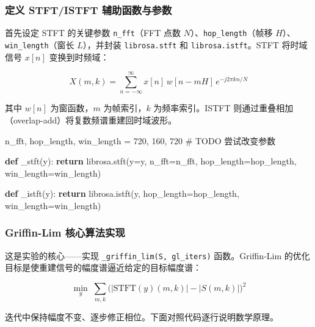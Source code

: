 \documentclass[
  english,
  letterpaper,
  DIV=11,
  numbers=noendperiod]{scrartcl}
\newenvironment{Shaded}{\begin{snugshade}}{\end{snugshade}}
\newcommand{\AlertTok}[1]{\textcolor[rgb]{0.68,0.00,0.00}{#1}}
\newcommand{\CommentTok}[1]{\textcolor[rgb]{0.37,0.37,0.37}{#1}}
\newcommand{\ControlFlowTok}[1]{\textcolor[rgb]{0.00,0.23,0.31}{\textbf{#1}}}
\newcommand{\DecValTok}[1]{\textcolor[rgb]{0.68,0.00,0.00}{#1}}
\newcommand{\KeywordTok}[1]{\textcolor[rgb]{0.00,0.23,0.31}{\textbf{#1}}}
\newcommand{\NormalTok}[1]{\textcolor[rgb]{0.00,0.23,0.31}{#1}}
\newcommand{\OperatorTok}[1]{\textcolor[rgb]{0.37,0.37,0.37}{#1}}
\begin{document}
\subsubsection{定义 STFT/ISTFT
辅助函数与参数}\label{ux5b9aux4e49-stftistft-ux8f85ux52a9ux51fdux6570ux4e0eux53c2ux6570}

首先设定 STFT 的关键参数 \texttt{n\_fft}（FFT 点数
\(N\)）、\texttt{hop\_length}（帧移 \(H\)）、\texttt{win\_length}（窗长
\(L\)），并封装 \texttt{librosa.stft} 和 \texttt{librosa.istft}。STFT
将时域信号 \(x[n]\) 变换到时频域：

\[X(m,k) = \sum_{n=-\infty}^{\infty} x[n]\, w[n - mH]\, e^{-j 2\pi kn/N}\]

其中 \(w[n]\) 为窗函数，\(m\) 为帧索引，\(k\) 为频率索引。ISTFT
则通过重叠相加（overlap-add）将复数频谱重建回时域波形。

\begin{Shaded}
\begin{Highlighting}[]
\NormalTok{n\_fft, hop\_length, win\_length }\OperatorTok{=} \DecValTok{720}\NormalTok{, }\DecValTok{160}\NormalTok{, }\DecValTok{720}  \CommentTok{\# }\AlertTok{TODO}\CommentTok{ 尝试改变参数}

\KeywordTok{def}\NormalTok{ \_stft(y):}
    \ControlFlowTok{return}\NormalTok{ librosa.stft(y}\OperatorTok{=}\NormalTok{y, n\_fft}\OperatorTok{=}\NormalTok{n\_fft,}
\NormalTok{                        hop\_length}\OperatorTok{=}\NormalTok{hop\_length,}
\NormalTok{                        win\_length}\OperatorTok{=}\NormalTok{win\_length)}

\KeywordTok{def}\NormalTok{ \_istft(y):}
    \ControlFlowTok{return}\NormalTok{ librosa.istft(y, hop\_length}\OperatorTok{=}\NormalTok{hop\_length,}
\NormalTok{                         win\_length}\OperatorTok{=}\NormalTok{win\_length)}
\end{Highlighting}
\end{Shaded}

\subsubsection{Griffin-Lim
核心算法实现}\label{griffin-lim-ux6838ux5fc3ux7b97ux6cd5ux5b9eux73b0}

这是实验的核心------实现 \texttt{\_griffin\_lim(S,\ gl\_iters)}
函数。Griffin-Lim 的优化目标是使重建信号的幅度谱逼近给定的目标幅度谱：

\[\min_{y}\; \sum_{m,k} \Big( |\text{STFT}(y)(m,k)| - |S(m,k)| \Big)^2\]

迭代中保持幅度不变、逐步修正相位。下面对照代码逐行说明数学原理。
\end{document}
